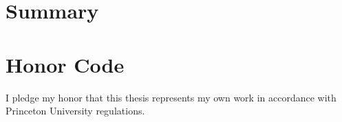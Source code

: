 \documentclass[pageno]{jpaper}
\begin{document}
\section{Summary}

\section{Honor Code}
\label{honorcode}
I pledge my honor that this thesis represents my own work in accordance with Princeton University regulations.

\pagebreak



\end{document}
